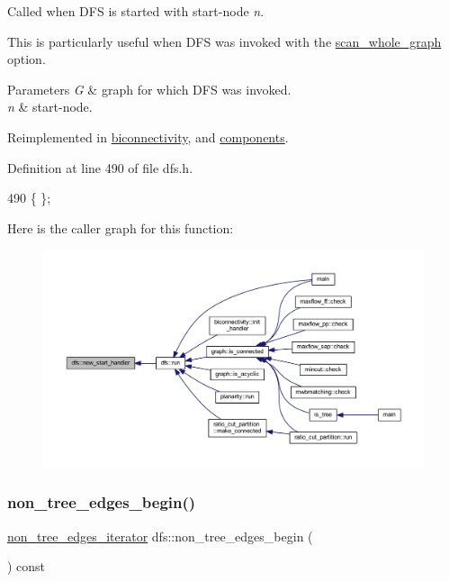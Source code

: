 Called when D\+FS is started with start-\/node {\itshape n}. 

This is particularly useful when D\+FS was invoked with the \mbox{\hyperlink{classdfs_aa7c864a6f3a120720138b187b3ed95b5}{scan\+\_\+whole\+\_\+graph}} option.


\begin{DoxyParams}{Parameters}
{\em G} & graph for which D\+FS was invoked. \\
\hline
{\em n} & start-\/node. \\
\hline
\end{DoxyParams}


Reimplemented in \mbox{\hyperlink{classbiconnectivity_ae94213830755f1f4d477ec6bff0f25b8}{biconnectivity}}, and \mbox{\hyperlink{classcomponents_af53365bd737b34cf63e4a6b10879ffcc}{components}}.



Definition at line 490 of file dfs.\+h.


\begin{DoxyCode}
490 \{ \};
\end{DoxyCode}
Here is the caller graph for this function\+:
\nopagebreak
\begin{figure}[H]
\begin{center}
\leavevmode
\includegraphics[width=350pt]{classdfs_a304b14458fb78f9feb3d8d5683d3cab5_icgraph}
\end{center}
\end{figure}
\mbox{\label{classdfs_a4efe5bb72d00305e6b226e67c2b2ef6e}} 
\subsubsection{\texorpdfstring{non\+\_\+tree\+\_\+edges\+\_\+begin()}{non\_tree\_edges\_begin()}}
{\footnotesize\ttfamily \mbox{\hyperlink{classdfs_a95e353f354d3b31daded0c4fe749171a}{non\+\_\+tree\+\_\+edges\+\_\+iterator}} dfs\+::non\+\_\+tree\+\_\+edges\+\_\+begin (\begin{DoxyParamCaption}{ }\end{DoxyParamCaption}) const\hspace{0.3cm}{\ttfamily [inline]}}



